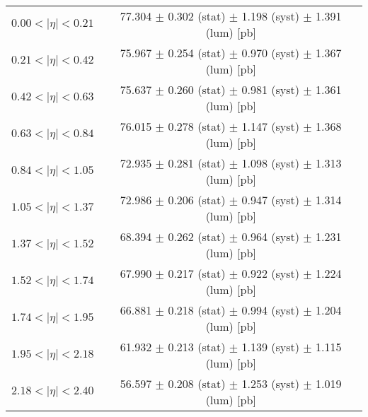 \begin{tabular}{lc}
\hline
$0.00 < |\eta| <0.21$          & 77.304 $\pm$ 0.302 (stat) $\pm$ 1.198 (syst) $\pm$ 1.391 (lum) [pb]  \\
$0.21 < |\eta| <0.42$          & 75.967 $\pm$ 0.254 (stat) $\pm$ 0.970 (syst) $\pm$ 1.367 (lum) [pb]  \\
$0.42 < |\eta| <0.63$          & 75.637 $\pm$ 0.260 (stat) $\pm$ 0.981 (syst) $\pm$ 1.361 (lum) [pb]  \\
$0.63 < |\eta| <0.84$          & 76.015 $\pm$ 0.278 (stat) $\pm$ 1.147 (syst) $\pm$ 1.368 (lum) [pb]  \\
$0.84 < |\eta| <1.05$          & 72.935 $\pm$ 0.281 (stat) $\pm$ 1.098 (syst) $\pm$ 1.313 (lum) [pb]  \\
$1.05 < |\eta| <1.37$          & 72.986 $\pm$ 0.206 (stat) $\pm$ 0.947 (syst) $\pm$ 1.314 (lum) [pb]  \\
$1.37 < |\eta| <1.52$          & 68.394 $\pm$ 0.262 (stat) $\pm$ 0.964 (syst) $\pm$ 1.231 (lum) [pb]  \\
$1.52 < |\eta| <1.74$          & 67.990 $\pm$ 0.217 (stat) $\pm$ 0.922 (syst) $\pm$ 1.224 (lum) [pb]  \\
$1.74 < |\eta| <1.95$          & 66.881 $\pm$ 0.218 (stat) $\pm$ 0.994 (syst) $\pm$ 1.204 (lum) [pb]  \\
$1.95 < |\eta| <2.18$          & 61.932 $\pm$ 0.213 (stat) $\pm$ 1.139 (syst) $\pm$ 1.115 (lum) [pb]  \\
$2.18 < |\eta| <2.40$          & 56.597 $\pm$ 0.208 (stat) $\pm$ 1.253 (syst) $\pm$ 1.019 (lum) [pb]  \\
\hline
\end{tabular}
